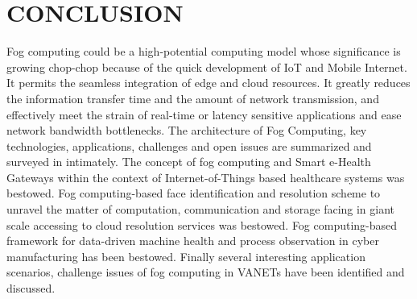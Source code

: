 \documentclass[10pt,a4paper,journal]{IEEEtran}
\begin{document}
\section{CONCLUSION}
\hspace*{1em}	Fog computing could be a high-potential computing model whose significance is growing chop-chop because of the quick development of IoT and Mobile Internet. It permits the seamless integration of edge and cloud resources. It greatly reduces the information transfer time and the amount of network transmission, and effectively meet the strain of real-time or latency sensitive applications and ease network bandwidth bottlenecks. The architecture of Fog Computing, key technologies, applications, challenges and open issues are summarized and surveyed in intimately. The concept of fog computing and Smart e-Health Gateways within the context of Internet-of-Things based healthcare systems was bestowed. Fog computing-based face identification and resolution scheme to unravel the matter of computation, communication and storage facing in giant scale accessing to cloud resolution services was bestowed. Fog computing-based framework for data-driven machine health and process observation in cyber manufacturing has been bestowed. Finally several interesting application scenarios, challenge issues of fog computing in VANETs have been identified and discussed.
\end{document}
